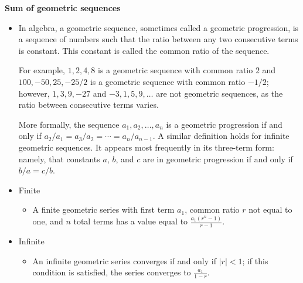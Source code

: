 \documentclass[11pt,letterpaper]{article}
\begin{document}
\vspace{0.4cm}
\begin{minipage}{\textwidth}
     \noindent \textbf{Sum of geometric sequences}
     \begin{itemize}
          \item In algebra, a geometric sequence, sometimes called a geometric progression, is a sequence of numbers such that the ratio between any two consecutive terms is constant. This constant is called the common ratio of the sequence.

          For example, $1, 2, 4, 8$ is a geometric sequence with common ratio $2$ and $100, -50, 25, -25/2$ is a geometric sequence with common ratio $-1/2$; however, $1, 3, 9, -27$ and $-3, 1, 5, 9, \ldots$ are not geometric sequences, as the ratio between consecutive terms varies.
          
          More formally, the sequence $a_1, a_2, \ldots , a_n$ is a geometric progression if and only if $a_2 / a_1 = a_3 / a_2 = \cdots = a_n / a_{n-1}$. A similar definition holds for infinite geometric sequences. It appears most frequently in its three-term form: namely, that constants $a$, $b$, and $c$ are in geometric progression if and only if $b / a = c / b$.
          \item Finite
          \begin{itemize}
               \item A finite geometric series with first term $a_1$, common ratio $r$ not equal to one, and $n$ total terms has a value equal to $\frac{a_1(r^n-1)}{r-1}$.
          \end{itemize}
          \item Infinite 
          \begin{itemize}
               \item An infinite geometric series converges if and only if $|r|<1$; if this condition is satisfied, the series converges to $\frac{a_1}{1-r}$.
          \end{itemize}
     \end{itemize}
\end{minipage}
\end{document}

